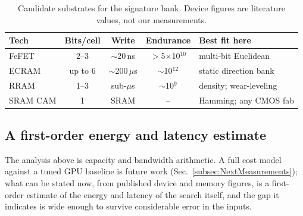 \documentclass[conference]{IEEEtran}
\newcommand{\cam}{{CAM}\xspace}
\newcommand{\fefet}{{FeFET}\xspace}
\begin{document}
\begin{table}[t]
\centering
\caption{Candidate substrates for the signature bank. Device figures are
literature values, not our measurements.}
\label{tab:devices}
{\footnotesize
\begin{tabular}{@{}lcccl@{}}
\toprule
\textbf{Tech} & \textbf{Bits/cell} & \textbf{Write} & \textbf{Endurance} &
\textbf{Best fit here} \\
\midrule
\fefet   & 2--3   & $\sim$20\,ns    & $>$5$\times$10$^{10}$ & multi-bit Euclidean \\
ECRAM    & up to 6 & $\sim$200\,$\mu$s & $\sim$10$^{12}$    & static direction bank \\
RRAM     & 1--3   & sub-$\mu$s      & $\sim$10$^{9}$        & density; wear-leveling \\
SRAM \cam & 1     & SRAM            & --                    & Hamming; any CMOS fab \\
\bottomrule
\end{tabular}}
\end{table}

\subsection{A first-order energy and latency estimate}
\label{subsec:CostModelGap}
The analysis above is capacity and bandwidth arithmetic. A full cost
model against a tuned GPU baseline is future work
(Sec.~\ref{subsec:NextMeasurements}); what can be stated now, from
published device and memory figures, is a first-order estimate of the
energy and latency of the search itself, and the gap it indicates is
wide enough to survive considerable error in the inputs.
\end{document}
